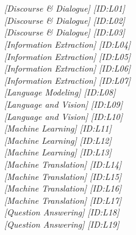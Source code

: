 \section[Poster Session A]{}
\bigskip{}
\par
{}\par
\bigskip{} 
\hfill \textit{[Discourse \& Dialogue]  [ID:L01]} \\ 
\hfill \textit{[Discourse \& Dialogue]  [ID:L02]} \\ 
\hfill \textit{[Discourse \& Dialogue]  [ID:L03]} \\ 
\hfill \textit{[Information Extraction]  [ID:L04]} \\ 
\hfill \textit{[Information Extraction]  [ID:L05]} \\ 
\hfill \textit{[Information Extraction]  [ID:L06]} \\ 
\hfill \textit{[Information Extraction]  [ID:L07]} \\ 
\hfill \textit{[Language Modeling]  [ID:L08]} \\ 
\hfill \textit{[Language and Vision]  [ID:L09]} \\ 
\hfill \textit{[Language and Vision]  [ID:L10]} \\ 
\hfill \textit{[Machine Learning]  [ID:L11]} \\ 
\hfill \textit{[Machine Learning]  [ID:L12]} \\ 
\hfill \textit{[Machine Learning]  [ID:L13]} \\ 
\hfill \textit{[Machine Translation]  [ID:L14]} \\ 
\hfill \textit{[Machine Translation]  [ID:L15]} \\ 
\hfill \textit{[Machine Translation]  [ID:L16]} \\ 
\hfill \textit{[Machine Translation]  [ID:L17]} \\ 
\hfill \textit{[Question Answering]  [ID:L18]} \\ 
\hfill \textit{[Question Answering]  [ID:L19]} \\ 
